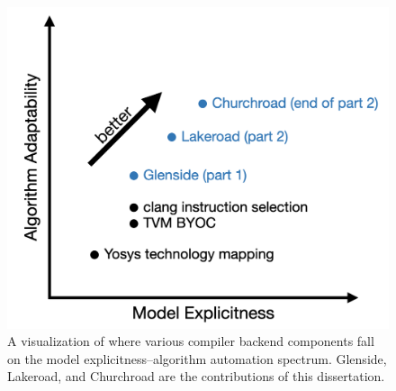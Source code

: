 \begin{figure}
    \centering
    \includegraphics[width=.7\textwidth]{intro-figures/model-alg-spectrum-keynote.png}
    \caption{
A visualization of where various compiler backend
  components
  fall
  on the model explicitness--algorithm automation
  spectrum.
Glenside, Lakeroad, and Churchroad
  are the contributions of this
  dissertation.
    }
    \label{fig:intro:model-alg-spectrum}
\end{figure}
